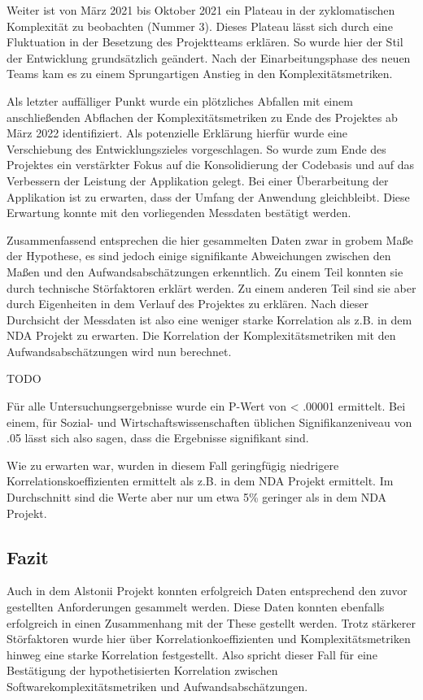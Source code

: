 Weiter ist von März 2021 bis Oktober 2021 ein Plateau in der
zyklomatischen Komplexität zu beobachten (Nummer 3). Dieses Plateau
lässt sich durch eine Fluktuation in der Besetzung des Projektteams
erklären. So wurde hier der Stil der Entwicklung grundsätzlich geändert.
Nach der Einarbeitungsphase des neuen Teams kam es zu einem
Sprungartigen Anstieg in den Komplexitätsmetriken.

Als letzter auffälliger Punkt wurde ein plötzliches Abfallen mit einem
anschließenden Abflachen der Komplexitätsmetriken zu Ende des Projektes
ab März 2022 identifiziert. Als potenzielle Erklärung hierfür wurde eine
Verschiebung des Entwicklungszieles vorgeschlagen. So wurde zum Ende des
Projektes ein verstärkter Fokus auf die Konsolidierung der Codebasis und
auf das Verbessern der Leistung der Applikation gelegt. Bei einer
Überarbeitung der Applikation ist zu erwarten, dass der Umfang der
Anwendung gleichbleibt. Diese Erwartung konnte mit den vorliegenden
Messdaten bestätigt werden.

Zusammenfassend entsprechen die hier gesammelten Daten zwar in grobem
Maße der Hypothese, es sind jedoch einige signifikante Abweichungen
zwischen den Maßen und den Aufwandsabschätzungen erkenntlich. Zu einem
Teil konnten sie durch technische Störfaktoren erklärt werden. Zu einem
anderen Teil sind sie aber durch Eigenheiten in dem Verlauf des
Projektes zu erklären. Nach dieser Durchsicht der Messdaten ist also
eine weniger starke Korrelation als z.B. in dem \ac{NDA} Projekt zu erwarten.
Die Korrelation der Komplexitätsmetriken mit den Aufwandsabschätzungen
wird nun berechnet.

TODO

Für alle Untersuchungsergebnisse wurde ein P-Wert von \textless{} .00001
ermittelt.
Bei einem, für Sozial- und Wirtschaftswissenschaften üblichen
Signifikanzeniveau von .05 lässt sich also sagen, dass die Ergebnisse
signifikant sind.

Wie zu erwarten war, wurden in diesem Fall geringfügig niedrigere
Korrelationskoeffizienten ermittelt als z.B. in dem \ac{NDA} Projekt
ermittelt. Im Durchschnitt sind die Werte aber nur um etwa 5\% geringer
als in dem \ac{NDA} Projekt.

\subsection{Fazit}\label{Alstonii-fazit}

Auch in dem Alstonii Projekt konnten erfolgreich Daten entsprechend
den zuvor gestellten Anforderungen gesammelt werden. Diese Daten konnten
ebenfalls erfolgreich in einen Zusammenhang mit der These gestellt
werden. Trotz stärkerer Störfaktoren wurde hier über
Korrelationkoeffizienten und Komplexitätsmetriken hinweg eine starke
Korrelation festgestellt. Also spricht dieser Fall für eine Bestätigung
der hypothetisierten Korrelation zwischen Softwarekomplexitätsmetriken
und Aufwandsabschätzungen.

